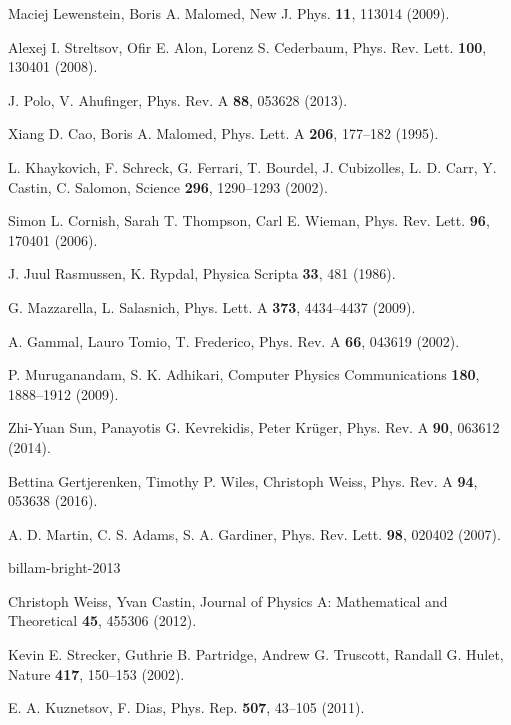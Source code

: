 \begin{thebibliography}{99}
Maciej Lewenstein, Boris A. Malomed,  New J. Phys. \textbf{11}, 113014  (2009).

Alexej I. Streltsov, Ofir E. Alon, Lorenz S. Cederbaum,  Phys. Rev. Lett. \textbf{100}, 130401  (2008).

J. Polo, V. Ahufinger,  Phys. Rev. A \textbf{88}, 053628  (2013).

Xiang D. Cao, Boris A. Malomed,  Phys. Lett. A \textbf{206}, 177--182  (1995).

L. Khaykovich, F. Schreck, G. Ferrari, T. Bourdel, J. Cubizolles, L. D. Carr, Y. Castin, C. Salomon,  Science \textbf{296}, 1290--1293  (2002).

Simon L. Cornish, Sarah T. Thompson, Carl E. Wieman,  Phys. Rev. Lett. \textbf{96}, 170401  (2006).

J. Juul Rasmussen, K. Rypdal,  Physica Scripta \textbf{33}, 481  (1986).

G. Mazzarella, L. Salasnich,  Phys. Lett. A \textbf{373}, 4434--4437  (2009).

A. Gammal, Lauro Tomio, T. Frederico,  Phys. Rev. A \textbf{66}, 043619  (2002).

P. Muruganandam, S. K. Adhikari,  Computer Physics Communications \textbf{180}, 1888--1912  (2009).

Zhi-Yuan Sun, Panayotis G. Kevrekidis, Peter Krüger,  Phys. Rev. A \textbf{90}, 063612  (2014).

Bettina Gertjerenken, Timothy P. Wiles, Christoph Weiss,  Phys. Rev. A \textbf{94}, 053638  (2016).

A. D. Martin, C. S. Adams, S. A. Gardiner,  Phys. Rev. Lett. \textbf{98}, 020402  (2007).

billam-bright-2013

Christoph Weiss, Yvan Castin,  Journal of Physics A: Mathematical and Theoretical \textbf{45}, 455306  (2012).

Kevin E. Strecker, Guthrie B. Partridge, Andrew G. Truscott, Randall G. Hulet,  Nature \textbf{417}, 150--153  (2002).

E. A. Kuznetsov, F. Dias,  Phys. Rep. \textbf{507}, 43--105  (2011).

\end{thebibliography}